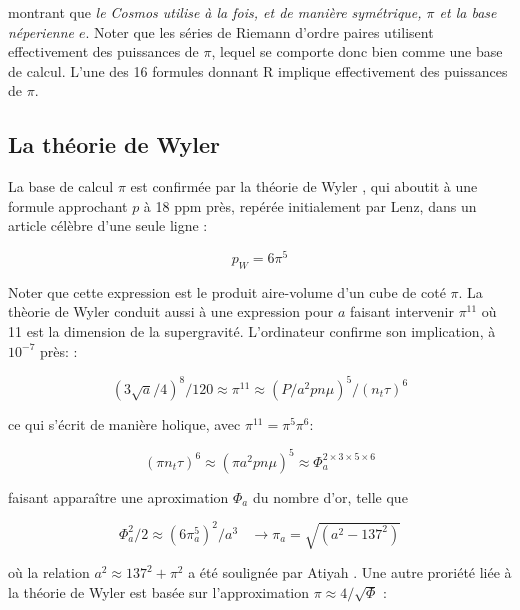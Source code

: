 \documentclass[a4paper,9pt]{article}
\newcounter{row}
\begin{document}
 
montrant que \textit{le Cosmos utilise à la fois, et de manière symétrique, $\pi$ et la base néperienne $e$}. Noter que les séries de Riemann d'ordre paires utilisent effectivement des puissances de $\pi$, lequel se comporte donc bien comme une base de calcul. L'une des 16 formules donnant R implique effectivement des puissances de $\pi$.











\subsection{La théorie de Wyler}
La base de calcul $\pi$ est confirmée par la théorie de Wyler \cite{Wyler}, qui aboutit à une formule approchant $p$ à 18 ppm près, repérée initialement par Lenz, dans un article célèbre d'une seule ligne \cite{Lenz}:

\begin{equation}
p_W = 6\pi^5
\end{equation}
 
Noter que cette expression est le produit aire-volume d'un cube de coté $\pi$. La thèorie de Wyler conduit aussi à une expression pour $a$ faisant intervenir $\pi^{11}$ où 11 est la dimension de la supergravité. L'ordinateur confirme son implication, à $10^{-7}$ près: :

\begin{equation}
(3\sqrt a/4)^8 /120 \approx \pi^{11} \approx (P/a^2pn\mu)^5/(n_t \tau)^6
\end{equation}
 
ce qui s'écrit de manière holique, avec $\pi^{11} = \pi^{5}\pi^{6}$:

\begin{equation}
(\pi n_t \tau)^6 \approx (\pi a^2pn\mu)^5 \approx \Phi_a^{2\times 3\times 5 \times 6}
\end{equation}

faisant apparaître une aproximation $\Phi_a$ du nombre d'or, telle que

\begin{equation}
\Phi_a^2/2 \approx (6\pi_a^5)^2/a^3  ~~~~ \rightarrow \pi_a = \sqrt {(a^2 - 137^2)}
\end{equation}

où la relation $a^2 \approx 137^2 + \pi^2$ a été soulignée par Atiyah \cite{Atiyah}. Une autre proriété liée à la théorie de Wyler est basée sur 
l'approximation $\pi \approx 4/\sqrt \Phi$ :
\end{document}
